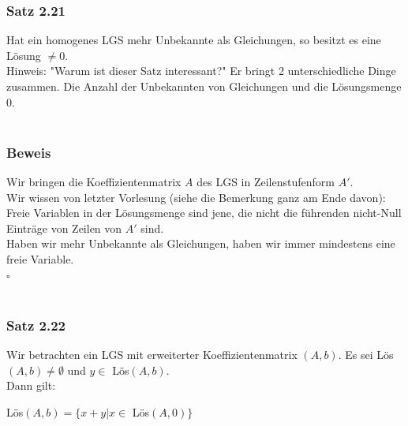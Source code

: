 \documentclass{article}
\begin{document}
\subsubsection*{Satz 2.21}
Hat ein homogenes LGS mehr Unbekannte als Gleichungen, so besitzt es eine Lösung $\neq 0$. \\
Hinweis: "Warum ist dieser Satz interessant?" Er bringt 2 unterschiedliche Dinge zusammen. Die Anzahl der Unbekannten von Gleichungen und die Lösungsmenge 0. \\
\\
\subsubsection*{Beweis}
Wir bringen die Koeffizientenmatrix $A$ des LGS in Zeilenstufenform $A'$. \\
Wir wissen von letzter Vorlesung (siehe die Bemerkung ganz am Ende davon): Freie Variablen in der Lösungsmenge sind jene, die nicht die führenden nicht-Null Einträge von Zeilen von $A'$ sind. \\
Haben wir mehr Unbekannte als Gleichungen, haben wir immer mindestens eine freie Variable. \\
$\square$ \\
\\
\subsubsection*{Satz 2.22}
Wir betrachten ein LGS mit erweiterter Koeffizientenmatrix $(A,b)$. Es sei Lös$(A,b) \neq \emptyset$ und $y \in $ Lös$(A,b)$. \\
Dann gilt: \\
\begin{center}
    Lös$(A,b) = \{x+y | x \in$ Lös$(A,0)\}$
\end{center}
\end{document}
